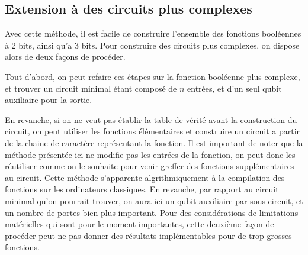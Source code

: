 \subsection*{Extension à des circuits plus complexes}
Avec cette méthode, il est facile de construire l'ensemble des fonctions booléennes à 2 bits, ainsi qu'a 3 bits. Pour construire des circuits plus complexes, on dispose alors de deux façons de procéder.

Tout d'abord, on peut refaire ces étapes sur la fonction booléenne plus complexe, et trouver un circuit minimal étant composé de $n$ entrées, et d'un seul qubit auxiliaire pour la sortie.

En revanche, si on ne veut pas établir la table de vérité avant la construction du circuit, on peut utiliser les fonctions élémentaires et construire un circuit a partir de la chaine de caractère représentant la fonction. Il est important de noter que la méthode présentée ici ne modifie pas les entrées de la fonction, on peut donc les réutiliser comme on le souhaite pour venir greffer des fonctions supplémentaires au circuit. Cette méthode s'apparente algrithmiquement à la compilation des fonctions sur les ordinateurs classiques. En revanche, par rapport au circuit minimal qu'on pourrait trouver, on aura ici un qubit auxiliaire par sous-circuit, et un nombre de portes bien plus important. Pour des considérations de limitations matérielles qui sont pour le moment importantes, cette deuxième façon de procéder peut ne pas donner des résultats implémentables pour de trop grosses fonctions.
